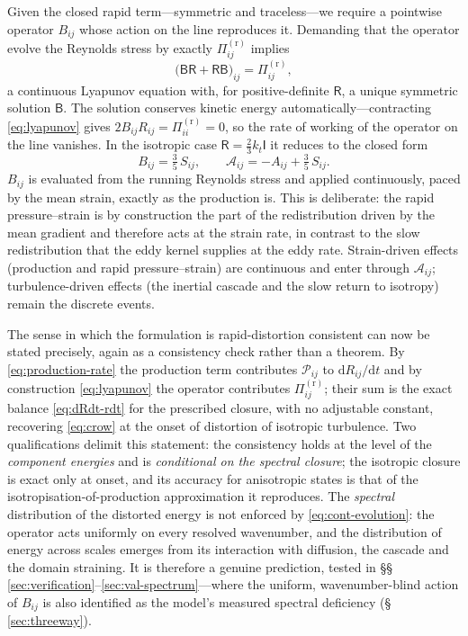\documentclass[lineno]{JFM-FLM_Au}
\begin{document}
Given the closed rapid term---symmetric and traceless---we require a
pointwise operator $B_{ij}$ whose action on the line reproduces it.
Demanding that the operator evolve the Reynolds stress by exactly
$\Pi^{(\mathrm r)}_{ij}$ implies
\begin{equation}
  \big(\mathsf{B}\mathsf{R}+\mathsf{R}\mathsf{B}\big)_{ij}
  = \Pi^{(\mathrm r)}_{ij},
  \label{eq:lyapunov}
\end{equation}
a continuous Lyapunov equation with, for positive-definite
$\mathsf{R}$, a unique symmetric solution $\mathsf{B}$. The solution
conserves kinetic energy automatically---contracting \eqref{eq:lyapunov}
gives $2B_{ij}R_{ij}=\Pi^{(\mathrm r)}_{ii}=0$, so the rate of working of
the operator on the line vanishes. In the isotropic case
$\mathsf{R}=\tfrac23k_t\mathsf{I}$ it reduces to the closed form
\begin{equation}
  B_{ij} = \tfrac{3}{5}\,S_{ij},
  \qquad
  \mathcal{A}_{ij} = -A_{ij} + \tfrac{3}{5}\,S_{ij}.
  \label{eq:iso-B}
\end{equation}
$B_{ij}$ is evaluated from the running Reynolds stress and applied
continuously, paced by the mean strain, exactly as the production is.
This is deliberate: the rapid pressure--strain is by construction the
part of the redistribution driven by the mean gradient and therefore acts
at the strain rate, in contrast to the slow redistribution that the eddy
kernel supplies at the eddy rate. Strain-driven effects (production and
rapid pressure--strain) are continuous and enter through
$\mathcal{A}_{ij}$; turbulence-driven effects (the inertial cascade and
the slow return to isotropy) remain the discrete events.

The sense in which the formulation is rapid-distortion consistent can now
be stated precisely, again as a consistency check rather than a theorem.
By \eqref{eq:production-rate} the production term contributes
$\mathcal{P}_{ij}$ to $\mathrm{d}R_{ij}/\mathrm{d}t$ and by construction
\eqref{eq:lyapunov} the operator contributes $\Pi^{(\mathrm r)}_{ij}$;
their sum is the exact balance \eqref{eq:dRdt-rdt} for the prescribed
closure, with no adjustable constant, recovering \eqref{eq:crow} at the
onset of distortion of isotropic turbulence. Two qualifications delimit
this statement: the consistency holds at the level of the
\emph{component energies} and is \emph{conditional on the
spectral closure}; the isotropic closure is exact only at onset, and its
accuracy for anisotropic states is that of the
isotropisation-of-production approximation it reproduces. The
\emph{spectral} distribution of the distorted energy is not enforced by
\eqref{eq:cont-evolution}: the operator acts uniformly on every resolved
wavenumber, and the distribution of energy across scales emerges from
its interaction with diffusion, the cascade and the domain straining. It
is therefore a genuine prediction, tested in
\S\S\,\ref{sec:verification}--\ref{sec:val-spectrum}---where the
uniform, wavenumber-blind action of $B_{ij}$ is also identified as the
model's measured spectral deficiency (\S\,\ref{sec:threeway}).
\end{document}
